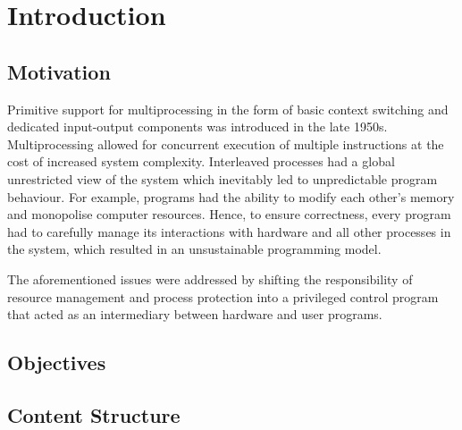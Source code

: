 \chapter{Introduction}
\section{Motivation}
Primitive support for multiprocessing in the form of basic context switching and dedicated input-output 
components was introduced in the late 1950s. Multiprocessing allowed for concurrent execution of 
multiple instructions at the cost of increased system complexity. Interleaved processes had a 
global unrestricted view of the system which inevitably led to unpredictable program behaviour. 
For example, programs had the ability to modify each other's memory and monopolise 
computer resources. Hence, to ensure correctness, every program had to carefully manage its interactions 
with hardware and all other processes in the system, which resulted in an unsustainable 
programming model.

The aforementioned issues were addressed by shifting the responsibility of resource management 
and process protection into a privileged control program that acted as an intermediary between 
hardware and user programs.

\section{Objectives}
\section{Content Structure}
